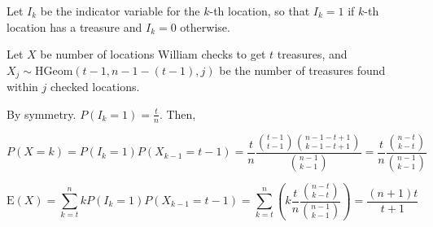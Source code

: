 Let $I_{k}$ be the indicator variable for the $k$-th location, so that $I_{k}=1$
if
$k$-th location has a treasure and $I_{k}=0$ otherwise.

Let $X$ be number of locations William checks to get $t$ treasures, and $X_{j}
\sim \text{HGeom}
(t-1,n-1-(t-1),j)$ be the number of treasures found within $j$ checked
locations.

By symmetry. $P(I_{k}=1) = \frac{t}{n}$. Then,

$$P(X = k) = P(I_{k}=1)P(X_{k-1}=t-1) = \frac{t}{n}\frac{\binom{t-1}
{t-1}\binom{n-1-t+1}{k-1-t+1}}{
\binom{n-1}{k-1}} = \frac{t}{n}\frac{\binom{n-t}{k-t}}{\binom{n-1}{k-1}}$$

$$\text{E}(X) = \sum_{k=t}^{n}k P(I_{k}=1)P(X_{k-1}=t-1) = \sum_{k=t}^{n}(k
\frac{t}{n}\frac{\binom{n-t}{k-t}}{\binom{n-1}{k-1}}) = \frac{(n+1)t}{t+1}$$